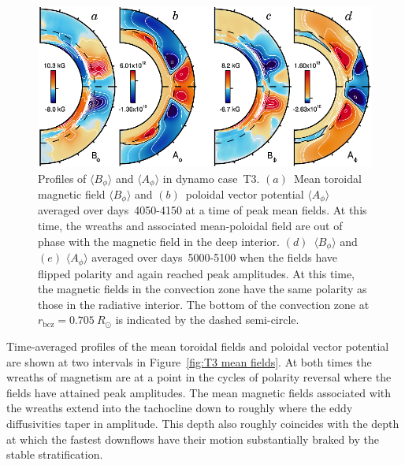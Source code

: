 \begin{figure}[!t]
  \begin{center}
    \includegraphics{figs/chapter_9/mhd_tacho_3_mean_fields.eps}
  \end{center}
  \caption[Profiles of $\langle B_\phi \rangle$ and $\langle A_\phi \rangle$ in dynamo case~T3]
          {Profiles of $\langle B_\phi \rangle$ and $\langle A_\phi \rangle$ in dynamo case~T3.
          $(a)$~Mean toroidal magnetic field $\langle B_\phi \rangle$ and
            $(b)$~poloidal vector potential $\langle A_\phi \rangle$ 
            averaged over days~4050-4150 at a time of peak
            mean fields.  At this time, the
            wreaths and associated mean-poloidal field are out of phase
            with the magnetic field in the deep interior.
          $(d)$~$\langle B_\phi \rangle$ and $(e)$ $\langle A_\phi \rangle$
            averaged over days~5000-5100 when the fields have flipped
            polarity and again reached peak amplitudes.  At this time,
            the magnetic fields in the convection zone have the same
            polarity as those in the radiative interior.  The bottom
            of the convection zone at $r_\mathrm{bcz}=0.705\:R_\odot$ is
            indicated by the dashed semi-circle.
          \label{fig:T3 mean fields}}
\end{figure}

Time-averaged profiles of the mean toroidal fields and poloidal vector
potential are shown at two intervals in Figure~\ref{fig:T3 mean
  fields}.  At both times the wreaths of magnetism are at a point in
the cycles of polarity reversal where the fields have attained peak
amplitudes.  The mean magnetic fields associated with the wreaths 
extend into the tachocline down to roughly where the eddy
diffusivities taper in amplitude.   This depth also roughly
coincides with the depth at which the fastest downflows have their 
motion substantially braked by the stable stratification.


